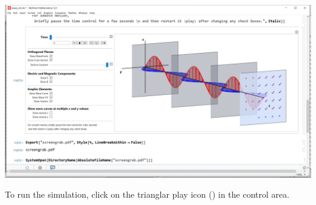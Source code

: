 \begin{center}
\includegraphics[width=\textwidth]{plane_waves/mathematica_applet/screen_shot.pdf}
\end{center}

To run the simulation, click on the trianglar play icon
()
in the  control area.

